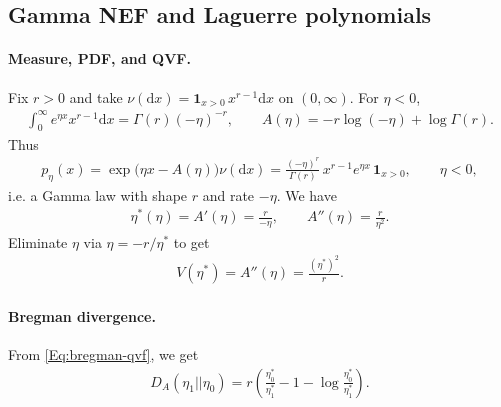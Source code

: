 \documentclass[a4paper,11pt]{article}
\numberwithin{equation}{section}
\theoremstyle{plain}
\theoremstyle{definition}
\theoremstyle{remark}
\newcommand{\1}{\ensuremath{\mathds{1}}\xspace}
\newcommand{\dd}{\ensuremath{{\textrm{d}}}\xspace}
\begin{document}
\subsection{Gamma NEF and Laguerre polynomials}
\paragraph{Measure, PDF, and QVF.} 
Fix $r>0$ and take $\nu(\dd x)=\mathbf{1}_{x>0}\,x^{r-1}\dd x$ on $(0,\infty)$. For $\eta<0$,
\begin{align}
\int_0^\infty e^{\eta x}x^{r-1}\dd x=\Gamma(r)(-\eta)^{-r},
\qquad
A(\eta)=-r\log(-\eta)+\log\Gamma(r).
\end{align}
Thus
\begin{align}
p_\eta(x)=\exp\!\big(\eta x-A(\eta)\big)\nu(\dd x)
=\frac{(-\eta)^r}{\Gamma(r)}\,x^{r-1}e^{\eta x}\,\mathbf{1}_{x>0},
\qquad \eta<0,
\end{align}
i.e. a Gamma law with shape $r$ and rate $-\eta$.
We have \begin{align}
\eta^\ast(\eta)=A'(\eta)=\frac{r}{-\eta},\qquad 
A''(\eta)=\frac{r}{\eta^2}.
\end{align}
Eliminate $\eta$ via $\eta=-r/\eta^\ast$ to get
\begin{align}
V(\eta^\ast)=A''(\eta)=\frac{(\eta^\ast)^2}{r}.
\end{align}
\paragraph{Bregman divergence.}

From \eqref{Eq:bregman-qvf}, we get
\begin{align}
    D_A(\eta_1||\eta_0)=r\left(\frac{\eta_0^\ast}{\eta_1^\ast}-1-\log\frac{\eta_0^\ast}{\eta_1^\ast}\right).
\end{align}
\end{document}
